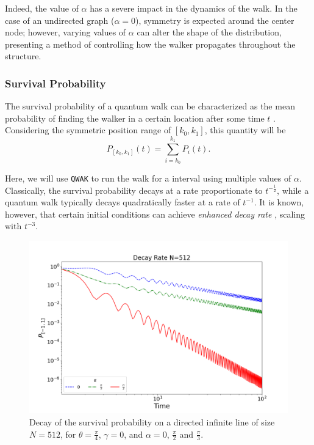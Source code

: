\documentclass[../../main.tex]{subfiles}
\begin{document}
Indeed, the value of $\alpha$ has a severe impact in the dynamics of the walk.
In the case of an undirected graph ($\alpha = 0$), symmetry is expected around
the center node; however, varying values of $\alpha$ can alter the shape of the
distribution, presenting a method of controlling how the walker propagates
throughout the structure.

\subsubsection{Survival Probability}
The survival probability of a quantum walk can be characterized as the mean
probability of finding the walker in a certain location after some time $t$
\cite{Goenuelol2011}. Considering the symmetric position range of $[k_0,k_1]$, this
quantity will be
\begin{equation}
    P_{[k_0,k_1]}(t)=\sum_{i=k_0}^{k_1} P_{i}(t).
\end{equation}

Here, we will use \texttt{QWAK} to run the walk for a interval using multiple
values of $\alpha$. Classically, the survival probability decays at a rate
proportionate to $t^{-\frac{1}{2}}$, while a quantum walk typically decays
quadratically faster at a rate of $t^{-1}$. It is known, however, that certain
initial conditions can achieve \textit{enhanced decay rate}
\cite{abalEffects06}, scaling with $t^{-3}$.\par

\begin{figure}[!h]
    \centering
    \includegraphics[scale=\mysinglefigurescale]{img/QWAK/OrientedDecayRate/decMatrix512NW3_Alpha1.05-1.57S500TMAX100.png}
    \caption{Decay of the survival probability on a directed infinite line of
        size $N=512$, for $\theta =\frac{\pi}{4}$, $\gamma=0$, and $\alpha=0$,
        $\frac{\pi}{2}$ and $\frac{\pi}{3}$.}
    \label{fig:decay_rate_oriented_line}
\end{figure}
\end{document}
